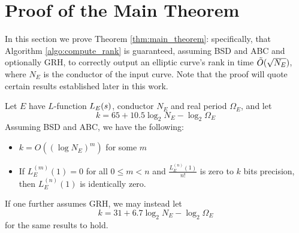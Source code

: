 
\section{Proof of the Main Theorem}\label{sec:main_thrm_proof}

In this section we prove Theorem \ref{thm:main_theorem}: specifically, that Algorithm \ref{algo:compute_rank} is guaranteed, assuming BSD and ABC and optionally GRH, to correctly output an elliptic curve's rank in time $\tilde{O}(\sqrt{N_E})$, where $N_E$ is the conductor of the input curve. Note that the proof will quote certain results established later in this work. \\

\begin{proposition}\label{prop:k_bits_for_leading_coeff}
Let $E$ have $L$-function $L_E(s)$, conductor $N_E$ and real period $\Omega_E$, and let
\begin{equation}\label{eqn:num_bits_without_GRH}
k = 65 + 10.5 \log_2 N_E - \log_2 \Omega_E
\end{equation}
Assuming BSD and ABC, we have the following:
\begin{itemize}
\item $k = O((\log N_E)^m)$ for some $m$
\item If $L_E^{(m)}(1)=0$ for all $0 \le m < n$ and $\frac{L_E^{(n)}(1)}{n!}$ is zero to $k$ bits precision, then $L_E^{(n)}(1)$ is identically zero.
\end{itemize}
\end{proposition}
If one further assumes GRH, we may instead let
\begin{equation}\label{eqn:num_bits_with_GRH}
k = 31 + 6.7 \log_2 N_E - \log_2 \Omega_E
\end{equation}
for the same results to hold.
